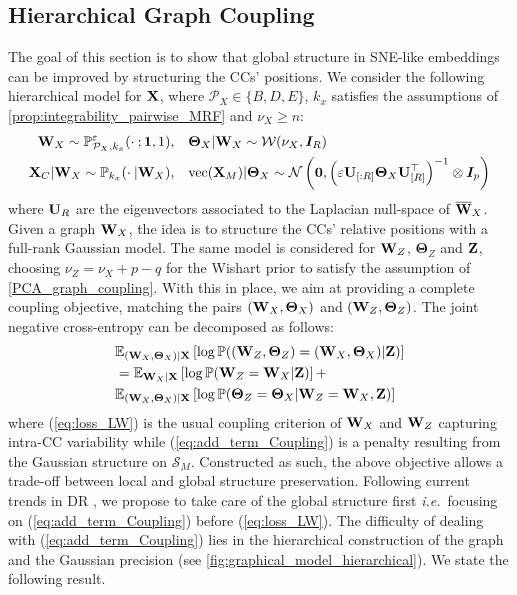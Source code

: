 \subsection{Hierarchical Graph Coupling}\label{sec:hierarchical_modelling}

The goal of this section is to show that global structure in SNE-like embeddings can be improved by structuring the CCs' positions. We consider the following hierarchical model for $\mathbf{X}$, where $\mathcal{P}_{X} \in \{B,D,E\}$, $k_x$ satisfies the assumptions of \cref{prop:integrability_pairwise_MRF} and $\nu_{X} \geq n$:
\begin{align*}
    \mathbf{W}_{X} \sim \mathbb{P}_{\mathcal{P}_X,k_x}^{\varepsilon}(\cdot \: ; \bm{1},1), &\quad \bm{\Theta}_{X} | \mathbf{W}_{X} \sim \mathcal{W}(\nu_{X}, \bm{I}_{R}) \\
    \mathbf{X}_{C} |\mathbf{W}_{X} \sim \mathbb{P}_{k_x}(\cdot \:| \mathbf{W}_{X}), &\quad \mathrm{vec}(\mathbf{X}_{M}) | \bm{\Theta}_{X} \sim \mathcal{N}\left(\bm{0}, \left(\varepsilon \mathbf{U}_{[:R]}  \bm{\Theta}_{X}\mathbf{U}^\top_{[R]}\right)^{-1} \otimes \bm{I}_p\right)
\end{align*}
where $\mathbf{U}_{R}$ are the eigenvectors associated to the Laplacian null-space of $\overline{\mathbf{W}}_{X}$. Given a graph $\mathbf{W}_{X}$, the idea is to structure the CCs' relative positions with a full-rank Gaussian model.
The same model is considered for $\mathbf{W}_{Z}$, $\bm{\Theta}_{Z}$ and $\mathbf{Z}$, choosing $\nu_{Z} = \nu_{X} + p - q$ for the Wishart prior to satisfy the assumption of \cref{PCA_graph_coupling}.  With this in place, we aim at providing a complete coupling objective, matching the pairs  $(\mathbf{W}_{X},\bm{\Theta}_{X})$ and  $(\mathbf{W}_{Z},\bm{\Theta}_{Z})$. The joint negative cross-entropy can be decomposed as follows:
\begin{align}
    &\mathbb{E}_{(\mathbf{W}_{X}, \bm{\Theta}_{X})|\mathbf{X}}\left[\log \mathbb{P}((\mathbf{W}_{Z},\bm{\Theta}_{Z}) = (\mathbf{W}_{X},\bm{\Theta}_{X}) | \mathbf{Z})\right] \nonumber\\
    &= \mathbb{E}_{\mathbf{W}_{X}|\mathbf{X}}\left[\log \mathbb{P}(\mathbf{W}_{Z} = \mathbf{W}_{X} | \mathbf{Z})\right] + \label{eq:loss_LW} \\
    & \mathbb{E}_{(\mathbf{W}_{X},\bm{\Theta}_{X})|\mathbf{X}}\left[ \log \mathbb{P}(\bm{\Theta}_{Z} = \bm{\Theta}_{X}| \mathbf{W}_{Z} = \mathbf{W}_{X}, \mathbf{Z}) \right] \label{eq:add_term_Coupling}
\end{align}
where (\ref{eq:loss_LW}) is the usual coupling criterion of $\mathbf{W}_X$ and $\mathbf{W}_Z$ capturing intra-CC variability while (\ref{eq:add_term_Coupling}) is a penalty resulting from the Gaussian structure on $\mathcal{S}_{M}$. Constructed as such, the above objective allows a trade-off between local and global structure preservation. Following current trends in DR \cite{kobak2021initialization}, we propose to take care of the global structure first \textit{i.e.}\ focusing on (\ref{eq:add_term_Coupling}) before (\ref{eq:loss_LW}). The difficulty of dealing with (\ref{eq:add_term_Coupling}) lies in the hierarchical construction of the graph and the Gaussian precision (see \cref{fig:graphical_model_hierarchical}). We state the following result.

